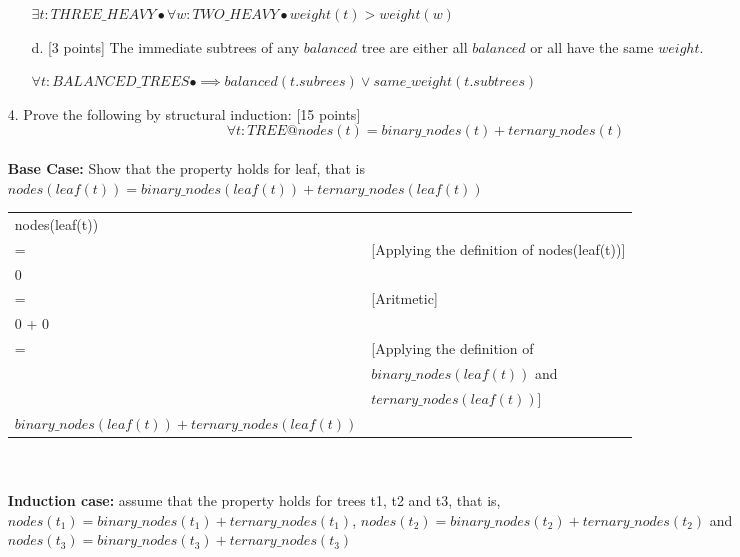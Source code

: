 \documentclass[12pt,fleqn]{article}
\begin{document}
\begin{enumerate}
\begin{enumerate}
\color{blue}  
$\exists t: THREE\_HEAVY \bullet \forall w: TWO\_HEAVY \bullet weight(t) > weight(w)$ \\
\color{black}
\item[d.] [3 points] The immediate subtrees of any $balanced$ tree are either all $balanced$ or all have the same $weight$. 

\color{blue}
$\forall t:BALANCED\_TREES \bullet \implies balanced(t.subrees) \lor same\_weight(t.subtrees) $ \\
\color{black}

\end{enumerate}

\clearpage

\item[4.] Prove the following by structural induction: [15 points]
  $$\forall t:TREE@nodes(t) = binary\_nodes(t) + ternary\_nodes(t)$$ \\
\color{blue}  
\textbf{Base Case:} Show that the property holds for leaf, that is $nodes(leaf(t)) = binary\_nodes(leaf(t)) + ternary\_nodes(leaf(t))$ \\ 

\begin{tabular}{l l}
  nodes(leaf(t)) &  \\
  = & [Applying the definition of nodes(leaf(t))]  \\
  0 & \\
  = & [Aritmetic] \\
  0 + 0 & \\
  = & [Applying the definition of \\
    &  $binary\_nodes(leaf(t))$ and \\
    & $ternary\_nodes(leaf(t))$] \\
  $binary\_nodes(leaf(t)) + ternary\_nodes(leaf(t))$ &  \\
\end{tabular}
\\
\\
\textbf{Induction case:} assume that the property holds for trees t1, t2 and t3, that is, $nodes(t_1) = binary\_nodes(t_1) +ternary\_nodes(t_1)$, $nodes(t_2) = binary\_nodes(t_2) +ternary\_nodes(t_2)$ and $nodes(t_3) = binary\_nodes(t_3) +ternary\_nodes(t_3)$ \\


\end{enumerate}
\end{document}
